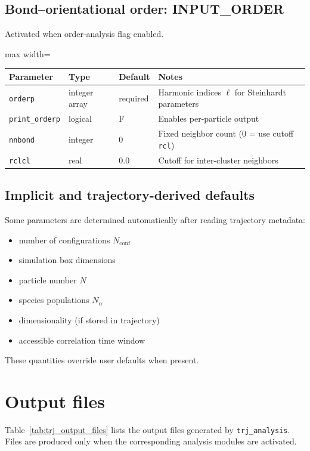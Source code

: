 \documentclass[final,1p,times]{elsarticle}
\begin{document}
\subsection{Bond–orientational order: INPUT\_ORDER}
Activated when order-analysis flag enabled.
\begin{center}
\begin{adjustbox}{max width=\textwidth}
\begin{tabular}{llll}
\hline
Parameter & Type & Default & Notes \\
\hline
\texttt{orderp} & integer array & required & Harmonic indices $\ell$ for Steinhardt parameters \\
\texttt{print\_orderp} & logical & F & Enables per-particle output \\
\texttt{nnbond} & integer & 0 & Fixed neighbor count (0 = use cutoff \texttt{rcl}) \\
\texttt{rclcl} & real & 0.0 & Cutoff for inter-cluster neighbors \\
\hline
\end{tabular}
\end{adjustbox}
\end{center}

\subsection{Implicit and trajectory-derived defaults}
Some parameters are determined automatically after reading trajectory metadata:
\begin{itemize}
\item number of configurations $N_{\mathrm{conf}}$
\item simulation box dimensions
\item particle number $N$
\item species populations $N_\alpha$
\item dimensionality (if stored in trajectory)
\item accessible correlation time window
\end{itemize}
These quantities override user defaults when present. 


\section{Output files}

Table~\ref{tab:trj_output_files} lists the output files generated by \texttt{trj\_analysis}. Files are produced only when the corresponding analysis modules are activated.
\end{document}
